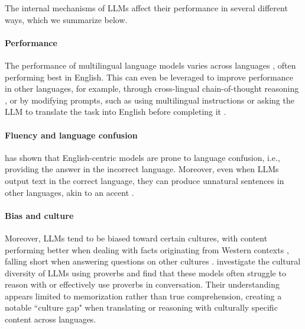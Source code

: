 The internal mechanisms of LLMs affect their performance in several different ways, which we summarize below.

\paragraph{Performance}
The performance of multilingual language models varies across languages \cite{shafayat2024multifactassessingfactualitymultilingual, huang2023languagescreatedequalllms, bang2023multitaskmultilingualmultimodalevaluation, shi2022language, ahuja2023megamultilingualevaluationgenerative}, often performing best in English.
This can even be leveraged to improve performance in other languages, for example, through cross-lingual chain-of-thought reasoning \cite{chai2024xcotcrosslingualinstructiontuning}, or by modifying prompts, such as using multilingual instructions or asking the LLM to translate the task into English before completing it \cite{zhu2023extrapolatinglargelanguagemodels, etxaniz2023multilinguallanguagemodelsthink}.

\paragraph{Fluency and language confusion}
\citet{marchisio2024understandingmitigatinglanguageconfusion} has shown that English-centric models are prone to language confusion, i.e., providing the answer in the incorrect language. 
Moreover, even when LLMs output text in the correct language, they can produce unnatural sentences in other languages, akin to an accent \cite{guo2024benchmarking}. 

\paragraph{Bias and culture}
 Moreover, LLMs tend to be biased toward certain cultures, with content performing better when dealing with facts originating from Western contexts \cite{naous2024havingbeerprayermeasuring, shafayat2024multifactassessingfactualitymultilingual}, falling short when answering questions on other cultures \cite{chiu2024culturalbenchrobustdiversechallenging}.
\citet{liu2024multilingualllmsculturallydiversereasoners} investigate the cultural diversity of LLMs using proverbs and find that these models often struggle to reason with or effectively use proverbs in conversation. Their understanding appears limited to memorization rather than true comprehension, creating a notable ``culture gap" when translating or reasoning with culturally specific content across languages.
